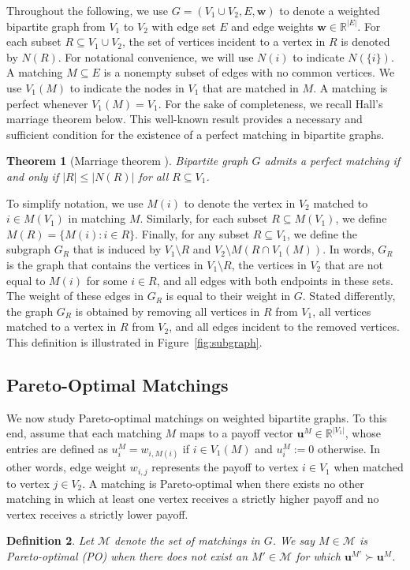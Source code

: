 \documentclass[a4paper, 11pt]{article}
\newtheorem{thm}{Theorem}
\newtheorem{defin}[thm]{Definition}
\newcommand{\mc}{\mathcal}
\begin{document}
Throughout the following, we use $G =  (V_1 \cup V_2, E, \bm{w})$ to denote a weighted bipartite graph from $V_1$ to $V_2$ with edge set $E$ and edge weights $\bm{w} \in \mathbb{R}^{|E|}$. For each subset $R \subseteq V_1 \cup V_2$, the set of vertices incident to a vertex in $R$ is denoted by $N(R)$. For notational convenience, we will use $N(i)$ to indicate $N(\{i\})$. A matching $M \subseteq E$ is a nonempty subset of edges with no common vertices. We use $V_1(M)$ to indicate the nodes in $V_1$ that are matched in $M$. A matching is perfect whenever $V_1(M) = V_1$. For the sake of completeness, we recall Hall's marriage theorem below. This well-known result provides a necessary and sufficient condition for the existence of a perfect matching in bipartite graphs. 
\begin{thm}[Marriage theorem \citep{hall1935representatives}] 
Bipartite graph $G$ admits a perfect matching if and only if $|R| \leq |N(R)|$ for all $R \subseteq V_1$.
\end{thm}
To simplify notation, we use $M(i)$ to denote the vertex in $V_2$ matched to $i \in M(V_1)$ in matching $M$. Similarly, for each subset $R \subseteq M(V_1)$, we define $M(R) = \{M(i): i \in R\}$. Finally, for any subset $R\subseteq V_1$, we define the subgraph $G_R$ that is induced by $V_1\setminus{R}$ and $V_2\setminus M(R \cap V_1(M))$. In words, $G_R$ is the graph that contains the vertices in $V_1\setminus R$, the vertices in $V_2$ that are not equal to $M(i)$ for some $i\in R$, and all edges with both endpoints in these sets. The weight of these edges in $G_R$ is equal to their weight in $G$. Stated differently, the graph $G_R$ is obtained by removing all vertices in $R$ from $V_1$, all vertices matched to a vertex in $R$ from $V_2$, and all edges incident to the removed vertices. This definition is illustrated in Figure~\ref{fig:subgraph}. 



\subsection{Pareto-Optimal Matchings}
\label{subsec:matchings_po}

We now study Pareto-optimal matchings on weighted bipartite graphs. To this end, assume that each matching $M$ maps to a payoff vector $\bm{u}^M \in \mathbb{R}^{|V_1|}$, whose entries are defined as $u_{i}^M = w_{i, M(i)}$ if $i \in V_1(M)$ and $u_{i}^M := 0$ otherwise. In other words, edge weight $w_{i,j}$ represents the payoff to vertex $i \in V_1$ when matched to vertex $j \in V_2$. A matching is Pareto-optimal when there exists no other matching in which at least one vertex receives a strictly higher payoff and no vertex receives a strictly lower payoff.
\begin{defin}
\label{def:po_matching}
Let $\mc{M}$ denote the set of matchings in $G$. We say $M \in \mc{M}$ is Pareto-optimal (PO) when there does not exist an $M' \in \mc{M}$ for which $\bm{u}^{M'} \succ \bm{u}^{M}$.
\end{defin}
\end{document}
